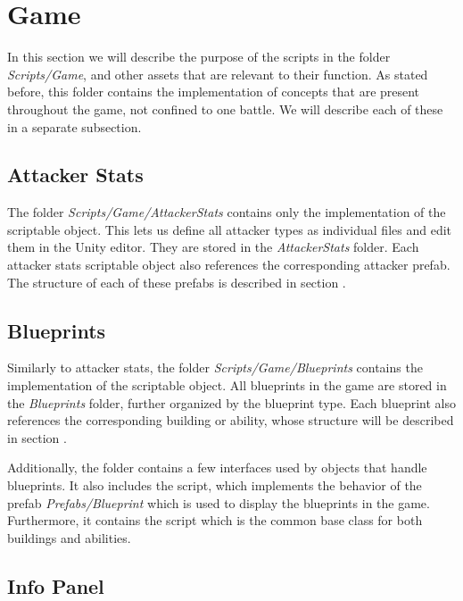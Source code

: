 \section{Game}\label{sec:docs-game}

In this section we will describe the purpose of the scripts in the folder \emph{Scripts/Game}, and other assets that are relevant to their function.
As stated before, this folder contains the implementation of concepts that are present throughout the game, not confined to one battle.
We will describe each of these in a separate subsection.

\subsection{Attacker Stats}

The folder \emph{Scripts/Game/AttackerStats} contains only the implementation of the  scriptable object.
This lets us define all attacker types as individual files and edit them in the Unity editor.
They are stored in the \emph{AttackerStats} folder.
Each attacker stats scriptable object also references the corresponding attacker prefab.
The structure of each of these prefabs is described in section .

\subsection{Blueprints}

Similarly to attacker stats, the folder \emph{Scripts/Game/Blueprints} contains the implementation of the  scriptable object.
All blueprints in the game are stored in the \emph{Blueprints} folder, further organized by the blueprint type.
Each blueprint also references the corresponding building or ability, whose structure will be described in section .

Additionally, the folder contains a few interfaces used by objects that handle blueprints.
It also includes the  script, which implements the behavior of the prefab \emph{Prefabs/Blueprint} which is used to display the blueprints in the game.
Furthermore, it contains the script  which is the common base class for both buildings and abilities.

\subsection{Info Panel}



